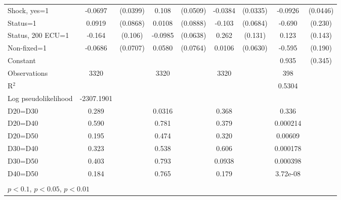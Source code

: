 \begin{tabular}{l|cccccc|cc}
Shock, yes=1    &  -0.0697\sym{*}  & (0.0399)&    0.108\sym{**} & (0.0509)&  -0.0384         & (0.0335)&  -0.0926\sym{**} & (0.0446)\\
Status=1        &   0.0919         & (0.0868)&   0.0108         & (0.0888)&   -0.103         & (0.0684)&   -0.690\sym{***}&  (0.230)\\
Status, 200 ECU=1&   -0.164         &  (0.106)&  -0.0985         & (0.0638)&    0.262\sym{**} &  (0.131)&    0.123         &  (0.143)\\
Non-fixed=1     &  -0.0686         & (0.0707)&   0.0580         & (0.0764)&   0.0106         & (0.0630)&   -0.595\sym{***}&  (0.190)\\
Constant        &                  &         &                  &         &                  &         &    0.935\sym{***}&  (0.345)\\
\hline
Observations    &     3320         &         &     3320         &         &     3320         &         &      398         &         \\
R$^2$      &                  &         &                  &         &                  &         &       0.5304    &   \\ 
Log pseudolikelihood  &  -2307.1901  &         &                  &         &                  &         &           &   \\ 
D20=D30         &    0.289         &         &   0.0316         &         &    0.368         &         &    0.336         &         \\
D20=D40         &    0.590         &         &    0.781         &         &    0.379         &         & 0.000214         &         \\
D20=D50         &    0.195         &         &    0.474         &         &    0.320         &         &  0.00609         &         \\
D30=D40         &    0.323         &         &    0.538         &         &    0.606         &         & 0.000178         &         \\
D30=D50         &    0.403         &         &    0.793         &         &   0.0938         &         & 0.000398         &         \\
D40=D50         &    0.184         &         &    0.765         &         &    0.179         &         & 3.72e-08         &         \\
\hline\hline
\multicolumn{9}{p{16cm}}{\tiny }\\
\multicolumn{9}{l}{\tiny \sym{*} \(p<0.1\), \sym{**} \(p<0.05\), \sym{***} \(p<0.01\)}\\
\end{tabular}
